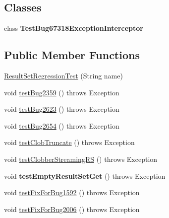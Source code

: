 \subsection*{Classes}
\begin{DoxyCompactItemize}
\item 
class {\bfseries Test\+Bug67318\+Exception\+Interceptor}
\end{DoxyCompactItemize}
\subsection*{Public Member Functions}
\begin{DoxyCompactItemize}
\item 
\mbox{\hyperlink{classtestsuite_1_1regression_1_1_result_set_regression_test_a5ca33c73ced6b3a694b444d75b08413b}{Result\+Set\+Regression\+Test}} (String name)
\item 
void \mbox{\hyperlink{classtestsuite_1_1regression_1_1_result_set_regression_test_abbc0f0354f17c3a1468ce5edd59b7ed0}{test\+Bug2359}} ()  throws Exception 
\item 
void \mbox{\hyperlink{classtestsuite_1_1regression_1_1_result_set_regression_test_a5cf13074c3f54ef463c169be1423a3ba}{test\+Bug2623}} ()  throws Exception 
\item 
void \mbox{\hyperlink{classtestsuite_1_1regression_1_1_result_set_regression_test_a32ba87707ddb894483b0813570ec5571}{test\+Bug2654}} ()  throws Exception 
\item 
void \mbox{\hyperlink{classtestsuite_1_1regression_1_1_result_set_regression_test_a4a5ee07e3208b64df9f192a86b6a4993}{test\+Clob\+Truncate}} ()  throws Exception 
\item 
void \mbox{\hyperlink{classtestsuite_1_1regression_1_1_result_set_regression_test_a98618c59f0d4f7f13323676c6352cdc8}{test\+Clobber\+Streaming\+RS}} ()  throws Exception 
\item 
\mbox{\label{classtestsuite_1_1regression_1_1_result_set_regression_test_aa66e7a3d877155bf047bd8f2dd7e42cb}} 
void {\bfseries test\+Empty\+Result\+Set\+Get} ()  throws Exception 
\item 
void \mbox{\hyperlink{classtestsuite_1_1regression_1_1_result_set_regression_test_af6f990a2b26f31cea60e13d460981d60}{test\+Fix\+For\+Bug1592}} ()  throws Exception 
\item 
void \mbox{\hyperlink{classtestsuite_1_1regression_1_1_result_set_regression_test_a184ac9b80b5364945565206d87d9e797}{test\+Fix\+For\+Bug2006}} ()  throws Exception 

\end{DoxyCompactItemize}
